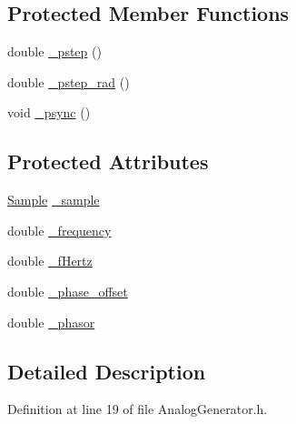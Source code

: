 \subsection*{Protected Member Functions}
\begin{DoxyCompactItemize}
\item 
double \hyperlink{classSignal_1_1SignalGenerator_a43b0eec84ee7df04c947533c0511c2c0}{\+\_\+pstep} ()
\item 
double \hyperlink{classSignal_1_1SignalGenerator_abf2f4ab977c6e84bf85022eab8135304}{\+\_\+pstep\+\_\+rad} ()
\item 
void \hyperlink{classSignal_1_1SignalGenerator_a563f57d4dfd8728a6a572f15c1e2532b}{\+\_\+psync} ()
\end{DoxyCompactItemize}
\subsection*{Protected Attributes}
\begin{DoxyCompactItemize}
\item 
\hyperlink{classSignal_1_1Sample}{Sample} \hyperlink{classSignal_1_1Analog_1_1AnalogGenerator_a8750d751c4dbc67084dfc74ab9a6a763}{\+\_\+sample}
\item 
double \hyperlink{classSignal_1_1SignalGenerator_a7f107461333bce68c5dad412db96a8c2}{\+\_\+frequency}
\item 
double \hyperlink{classSignal_1_1SignalGenerator_a85a4702347352bab1c71e0a8df8437d6}{\+\_\+f\+Hertz}
\item 
double \hyperlink{classSignal_1_1SignalGenerator_a6b4444d46747c8517171edbbf4b5588f}{\+\_\+phase\+\_\+offset}
\item 
double \hyperlink{classSignal_1_1SignalGenerator_af4aa0728ded00777be26a06d883eaeb3}{\+\_\+phasor}
\end{DoxyCompactItemize}


\subsection{Detailed Description}


Definition at line 19 of file Analog\+Generator.\+h.



